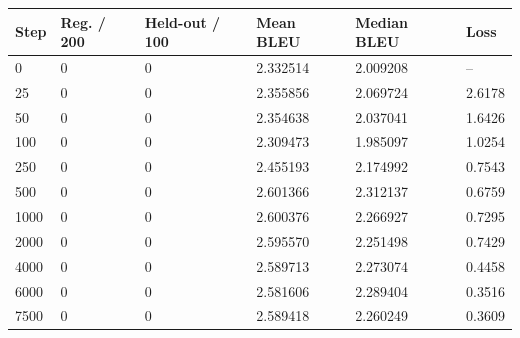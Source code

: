 \begin{tabular}{llllll}
\toprule
Step & Reg. / 200 & Held-out / 100 & Mean BLEU & Median BLEU & Loss \\
\midrule
0 & 0 & 0 & 2.332514 & 2.009208 & -- \\
25 & 0 & 0 & 2.355856 & 2.069724 & 2.6178 \\
50 & 0 & 0 & 2.354638 & 2.037041 & 1.6426 \\
100 & 0 & 0 & 2.309473 & 1.985097 & 1.0254 \\
250 & 0 & 0 & 2.455193 & 2.174992 & 0.7543 \\
500 & 0 & 0 & 2.601366 & 2.312137 & 0.6759 \\
1000 & 0 & 0 & 2.600376 & 2.266927 & 0.7295 \\
2000 & 0 & 0 & 2.595570 & 2.251498 & 0.7429 \\
4000 & 0 & 0 & 2.589713 & 2.273074 & 0.4458 \\
6000 & 0 & 0 & 2.581606 & 2.289404 & 0.3516 \\
7500 & 0 & 0 & 2.589418 & 2.260249 & 0.3609 \\
\bottomrule
\end{tabular}
